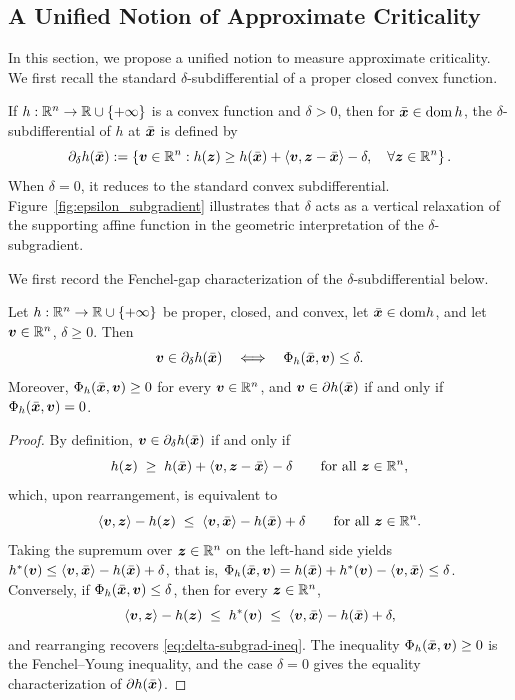 \subsection{A Unified Notion of Approximate Criticality}
\label{sec:criticality}
In this section, we propose a unified notion to measure approximate criticality. We first recall the standard \(\delta\)-subdifferential of a proper closed convex function.

If $h:\mathbb{R}^n\to\mathbb{R}\cup\{+\infty\}$ is a convex function and $\delta > 0$, then for $\bar{\bm{x}}\in\operatorname{dom} h$, the $\delta$-subdifferential of $h$ at $\bar{\bm{x}}$ is defined by
\[
    \partial_\delta h(\bar{\bm{x}})
    :=
    \left\{
    \bm{v}\in\mathbb{R}^n:
    h(\bm{z})\ge h(\bar{\bm{x}})
    +\langle \bm{v},\bm{z}-\bar{\bm{x}}\rangle-\delta,
    \quad \forall \bm{z}\in\mathbb{R}^n
    \right\}.
\] 
When $\delta=0$, it reduces to the standard convex subdifferential. 
Figure~\ref{fig:epsilon_subgradient} illustrates that $\delta$ acts as a vertical relaxation of the supporting affine function in the geometric interpretation of the $\delta$-subgradient.

We first record the Fenchel-gap characterization of the
$\delta$-subdifferential below.
\begin{lemma}
\label{lem:fenchel-gap-toolkit}
Let $h:\mathbb{R}^n\to\mathbb{R}\cup\{+\infty\}$ be proper, closed, and convex, let
$\bar{\bm{x}}\in\mathrm{dom} h$, and let $\bm{v}\in\mathbb{R}^n$, $\delta\ge0$. Then
\[
    \bm{v}\in\partial_\delta h(\bar{\bm{x}})
    \quad\Longleftrightarrow\quad
    \Phi_h(\bar{\bm{x}},\bm{v})\le\delta .
\]
Moreover, $\Phi_h(\bar{\bm{x}},\bm{v})\ge0$ for every $\bm{v}\in\mathbb{R}^n$, and
$\bm{v}\in\partial h(\bar{\bm{x}})$ if and only if $\Phi_h(\bar{\bm{x}},\bm{v})=0$.
\end{lemma}

\begin{proof}
By definition, $\bm{v}\in\partial_\delta h(\bar{\bm{x}})$ if and only if
\begin{equation}
    h(\bm{z})\;\ge\;h(\bar{\bm{x}})+\langle\bm{v},\bm{z}-\bar{\bm{x}}\rangle-\delta
    \qquad\text{for all }\bm{z}\in\mathbb{R}^n,
    \label{eq:delta-subgrad-ineq}
\end{equation}
which, upon rearrangement, is equivalent to
\[
    \langle\bm{v},\bm{z}\rangle-h(\bm{z})
    \;\le\;
    \langle\bm{v},\bar{\bm{x}}\rangle-h(\bar{\bm{x}})+\delta
    \qquad\text{for all }\bm{z}\in\mathbb{R}^n.
\]
Taking the supremum over $\bm{z}\in\mathbb{R}^n$ on the left-hand side yields
$h^*(\bm{v})\le\langle\bm{v},\bar{\bm{x}}\rangle-h(\bar{\bm{x}})+\delta$, that is,
$\Phi_h(\bar{\bm{x}},\bm{v})=h(\bar{\bm{x}})+h^*(\bm{v})-\langle\bm{v},\bar{\bm{x}}\rangle
\le\delta$. Conversely, if $\Phi_h(\bar{\bm{x}},\bm{v})\le\delta$, then for every
$\bm{z}\in\mathbb{R}^n$,
\[
    \langle\bm{v},\bm{z}\rangle-h(\bm{z})
    \;\le\;
    h^*(\bm{v})
    \;\le\;
    \langle\bm{v},\bar{\bm{x}}\rangle-h(\bar{\bm{x}})+\delta,
\]
and rearranging recovers \eqref{eq:delta-subgrad-ineq}. The inequality
$\Phi_h(\bar{\bm{x}},\bm{v})\ge0$ is the Fenchel--Young inequality, and the case
$\delta=0$ gives the equality characterization of $\partial h(\bar{\bm{x}})$.
\end{proof}


